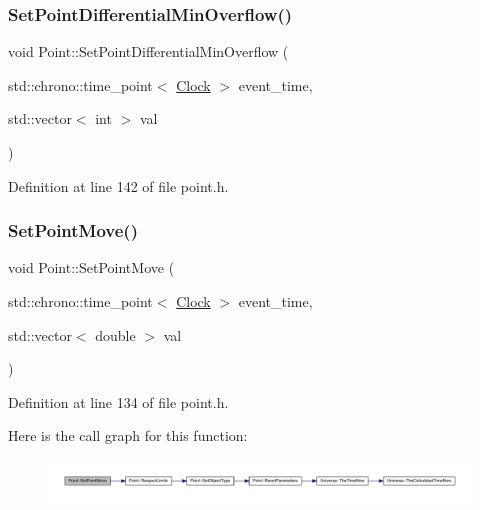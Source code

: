 \subsubsection{\texorpdfstring{Set\+Point\+Differential\+Min\+Overflow()}{SetPointDifferentialMinOverflow()}}
{\footnotesize\ttfamily void Point\+::\+Set\+Point\+Differential\+Min\+Overflow (\begin{DoxyParamCaption}\item[{std\+::chrono\+::time\+\_\+point$<$ \hyperlink{universe_8h_a0ef8d951d1ca5ab3cfaf7ab4c7a6fd80}{Clock} $>$}]{event\+\_\+time,  }\item[{std\+::vector$<$ int $>$}]{val }\end{DoxyParamCaption})\hspace{0.3cm}{\ttfamily [inline]}}



Definition at line 142 of file point.\+h.

\mbox{\label{class_point_a2cf44d5cf17ecf2b3385bde963678589}} 
\subsubsection{\texorpdfstring{Set\+Point\+Move()}{SetPointMove()}}
{\footnotesize\ttfamily void Point\+::\+Set\+Point\+Move (\begin{DoxyParamCaption}\item[{std\+::chrono\+::time\+\_\+point$<$ \hyperlink{universe_8h_a0ef8d951d1ca5ab3cfaf7ab4c7a6fd80}{Clock} $>$}]{event\+\_\+time,  }\item[{std\+::vector$<$ double $>$}]{val }\end{DoxyParamCaption})\hspace{0.3cm}{\ttfamily [inline]}}



Definition at line 134 of file point.\+h.

Here is the call graph for this function\+:
\nopagebreak
\begin{figure}[H]
\begin{center}
\leavevmode
\includegraphics[width=350pt]{class_point_a2cf44d5cf17ecf2b3385bde963678589_cgraph}
\end{center}
\end{figure}
\mbox{\label{class_point_afa3c2290a72c99e8892029eaa6676204}} 
